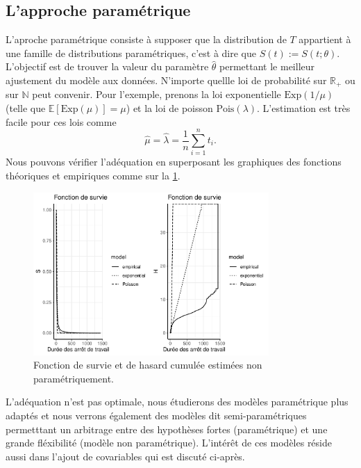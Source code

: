 \subsection{L'approche paramétrique}
L'aproche paramétrique consiste à supposer que la distribution de $T$ appartient à une famille de distributions paramétriques, c'est à dire que $S(t) := S(t;\theta)$. L'objectif est de trouver la valeur du paramètre $\widehat{\theta}$ permettant le meilleur ajustement du modèle aux données.  N'importe quellle loi de probabilité sur $\mathbb{R}_+$ ou sur $\mathbb{N}$ peut convenir. Pour l'exemple, prenons la loi exponentielle $\text{Exp}(1/\mu)$ (telle que $\mathbb{E}[\text{Exp}(\mu)] = \mu$) et la loi de poisson $\text{Pois}(\lambda)$. L'estimation est très facile pour ces lois comme 
$$
\widehat{\mu} = \widehat{\lambda} = \frac{1}{n}\sum_{i=1}^nt_i.
$$
Nous pouvons vérifier l'adéquation en superposant les graphiques des fonctions théoriques et empiriques comme sur la \cref{fig:INC_S_H_p}.
\begin{figure}[h!]
\centering
\includegraphics[width = 0.8\textwidth]{../figures/INC_S_H_p}
\caption{Fonction de survie et de hasard cumulée estimées non paramétriquement.}
\label{fig:INC_S_H_p}
\end{figure}
L'adéquation n'est pas optimale, nous étudierons des modèles paramétrique plus adaptés et nous verrons également des modèles dit semi-paramétriques permetttant un arbitrage entre des hypothèses fortes (paramétrique) et une grande fléxibilité (modèle non paramétrique). L'intérêt de ces modèles réside aussi dans l'ajout de covariables qui est discuté ci-après.
